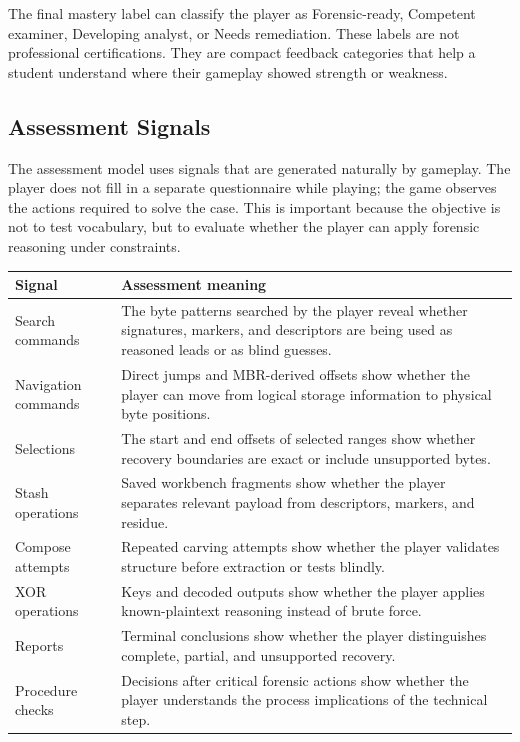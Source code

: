 \documentclass[11pt,a4paper]{article}
\begin{document}
The final mastery label can classify the player as Forensic-ready, Competent examiner, Developing analyst, or Needs remediation. These labels are not professional certifications. They are compact feedback categories that help a student understand where their gameplay showed strength or weakness.

\subsection{Assessment Signals}

The assessment model uses signals that are generated naturally by gameplay. The player does not fill in a separate questionnaire while playing; the game observes the actions required to solve the case. This is important because the objective is not to test vocabulary, but to evaluate whether the player can apply forensic reasoning under constraints.

\begin{longtable}{p{}p{}}
\toprule
\textbf{Signal} & \textbf{Assessment meaning} \\
\midrule
Search commands & The byte patterns searched by the player reveal whether signatures, markers, and descriptors are being used as reasoned leads or as blind guesses. \\
Navigation commands & Direct jumps and MBR-derived offsets show whether the player can move from logical storage information to physical byte positions. \\
Selections & The start and end offsets of selected ranges show whether recovery boundaries are exact or include unsupported bytes. \\
Stash operations & Saved workbench fragments show whether the player separates relevant payload from descriptors, markers, and residue. \\
Compose attempts & Repeated carving attempts show whether the player validates structure before extraction or tests blindly. \\
XOR operations & Keys and decoded outputs show whether the player applies known-plaintext reasoning instead of brute force. \\
Reports & Terminal conclusions show whether the player distinguishes complete, partial, and unsupported recovery. \\
Procedure checks & Decisions after critical forensic actions show whether the player understands the process implications of the technical step. \\
\bottomrule
\end{longtable}
\end{document}
